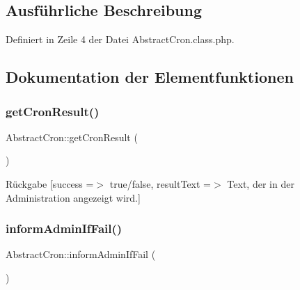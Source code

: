 \subsection{Ausführliche Beschreibung}


Definiert in Zeile 4 der Datei Abstract\+Cron.\+class.\+php.



\subsection{Dokumentation der Elementfunktionen}
\mbox{\label{class_abstract_cron_abf70f559a58a6ceeb823b81b51fbbfe1}} 
\subsubsection{\texorpdfstring{get\+Cron\+Result()}{getCronResult()}}
{\footnotesize\ttfamily Abstract\+Cron\+::get\+Cron\+Result (\begin{DoxyParamCaption}{ }\end{DoxyParamCaption})\hspace{0.3cm}{\ttfamily [abstract]}}

\begin{DoxyReturn}{Rückgabe}
\mbox{[}\textquotesingle{}success\textquotesingle{} =$>$ \textquotesingle{}true/false\textquotesingle{}, \textquotesingle{}result\+Text\textquotesingle{} =$>$ \textquotesingle{}Text, der in der Administration angezeigt wird.\textquotesingle{}\mbox{]} 
\end{DoxyReturn}
\mbox{\label{class_abstract_cron_a2fcdc1fa0cf8a5f8c214371a96534d17}} 
\subsubsection{\texorpdfstring{inform\+Admin\+If\+Fail()}{informAdminIfFail()}}
{\footnotesize\ttfamily Abstract\+Cron\+::inform\+Admin\+If\+Fail (\begin{DoxyParamCaption}{ }\end{DoxyParamCaption})\hspace{0.3cm}{\ttfamily [abstract]}}

